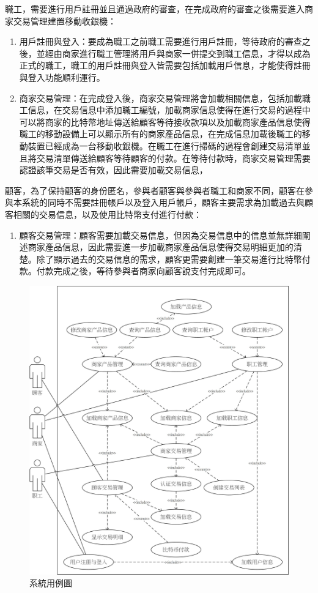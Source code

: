 職工，需要進行用戶註冊並且通過政府的審查，在完成政府的審查之後需要進入商家交易管理建置移動收銀機：

	\begin{enumerate}
	\item 用戶註冊與登入：要成為職工之前職工需要進行用戶註冊，等待政府的審查之後，並經由商家進行職工管理將用戶與商家一併提交到職工信息，才得以成為正式的職工，職工的用戶註冊與登入皆需要包括加載用戶信息，才能使得註冊與登入功能順利運行。
	\item 商家交易管理：在完成登入後，商家交易管理將會加載相關信息，包括加載職工信息，在交易信息中添加職工編號，加載商家信息使得在進行交易的過程中可以將商家的比特幣地址傳送給顧客等待接收款項以及加載商家產品信息使得職工的移動設備上可以顯示所有的商家產品信息，在完成信息加載後職工的移動裝置已經成為一台移動收銀機。在職工在進行掃碼的過程會創建交易清單並且將交易清單傳送給顧客等待顧客的付款。在等待付款時，商家交易管理需要認證該筆交易是否有效，因此需要加載交易信息，
	\end{enumerate}

顧客，為了保持顧客的身份匿名，參與者顧客與參與者職工和商家不同，顧客在參與本系統的同時不需要註冊帳戶以及登入用戶帳戶，顧客主要需求為加載過去與顧客相關的交易信息，以及使用比特幣支付進行付款：
	\begin{enumerate}
	\item 顧客交易管理：顧客需要加載交易信息，但因為交易信息中的信息並無詳細闡述商家產品信息，因此需要進一步加載商家產品信息使得交易明細更加的清楚。除了顯示過去的交易信息的需求，顧客更需要創建一筆交易進行比特幣付款。付款完成之後，等待參與者商家向顧客說支付完成即可。
	\end{enumerate}

	\begin{figure}[!htbp]
	\centering
	\includegraphics[width = 1\textwidth]{UC.jpg}
	\caption{系統用例圖}\label{UC}
	\end{figure}

